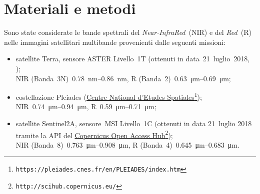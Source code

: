 \documentclass[12pt,a4paper,italian,twoside]{scrbook}
\begin{document}
\section{Materiali e metodi}
Sono state considerate le bande spettrali del \emph{Near-InfraRed}~(NIR) e del \emph{Red}~(R) nelle immagini satellitari multibande provenienti dalle seguenti missioni:
%
\begin{itemize}
	\item satellite Terra, sensore ASTER Livello~1T (ottenuti in data~21~luglio~2018, \cite{data:ASTER});  
		\\
		NIR (Banda~3N)~\SIrange[range-phrase={-}]{0.78}{0.86}{\nano\m}, R (Banda~2)~\SIrange[range-phrase={-}]{0.63}{0.69}{\micro\m};
	\item costellazione Pleiades (\href{https://pleiades.cnes.fr/en/PLEIADES/index.htm}{Centre National d'Etudes Spatiales}\footnote{\texttt{https://pleiades.cnes.fr/en/PLEIADES/index.htm}}); 
		\\
		NIR~\SIrange[range-phrase={-}]{0.74}{0.94}{\micro\m}, R~\SIrange[range-phrase={-}]{0.59}{0.71}{\micro\m};
	\item satellite Sentinel2A, sensore~MSI Livello~1C (ottenuti in data 21~luglio 2018 tramite la API del \href{http://scihub.copernicus.eu/}{Copernicus Open Access Hub}\footnote{\texttt{http://scihub.copernicus.eu/}});
		\\
		NIR (Banda~8)~\SIrange[range-phrase={-}]{0.763}{0.908}{\micro\m}, R (Banda~4)~\SIrange[range-phrase={-}]{0.645}{0.683}{\micro\m}.
\end{itemize}
%
\end{document}
